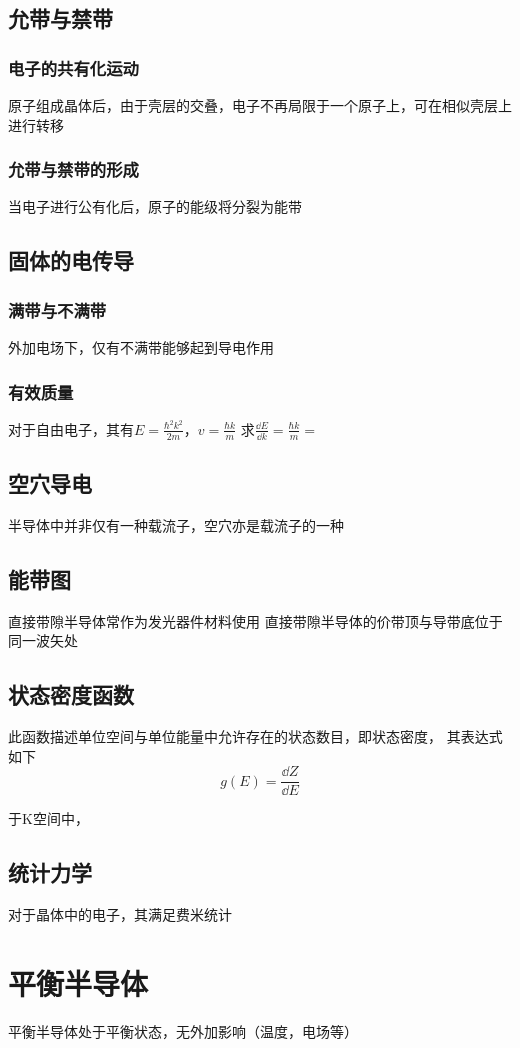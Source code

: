 \documentclass[12pt]{ctexart}
\begin{document}
\subsection{允带与禁带}
\subsubsection{电子的共有化运动}
原子组成晶体后，由于壳层的交叠，电子不再局限于一个原子上，可在相似壳层上进行转移
\subsubsection{允带与禁带的形成}
当电子进行公有化后，原子的能级将分裂为能带
\subsection{固体的电传导}
\subsubsection{满带与不满带}
外加电场下，仅有不满带能够起到导电作用
\subsubsection{有效质量}
对于自由电子，其有$E=\frac{\hbar^2k^2}{2m}$，$v=\frac{\hbar k}{m}$
求$\frac{\dd E}{\dd k}=\frac{\hbar k }{m}=$
\subsection{空穴导电}
半导体中并非仅有一种载流子，空穴亦是载流子的一种
\subsection{能带图}
直接带隙半导体常作为发光器件材料使用
直接带隙半导体的价带顶与导带底位于同一波矢处
\subsection{状态密度函数}
此函数描述单位空间与单位能量中允许存在的状态数目，即状态密度，
其表达式如下
$$g(E)=\frac{\dd Z}{\dd E}$$

于K空间中，

\subsection{统计力学}
对于晶体中的电子，其满足费米统计
\section{平衡半导体}
平衡半导体处于平衡状态，无外加影响（温度，电场等）
\end{document}
